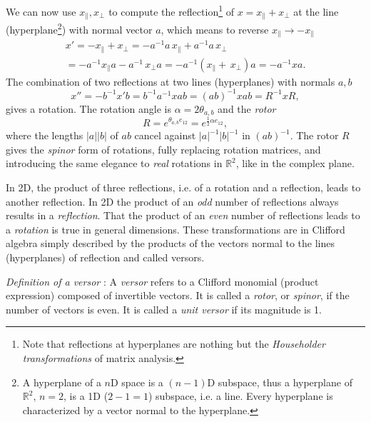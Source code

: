 \documentclass[cameraready]{jcmsi}%
\newcommand{\R}{\mathbb{R}}
\newcommand{\be}{\begin{equation}}
\newcommand{\ee}{\end{equation}}
\begin{document}
We can now use $x_{\parallel}, x_{\perp}$ to compute the reflection\footnote{Note that reflections at hyperplanes are nothing but the \textit{Householder transformations} \cite{Wiki:Householder} of matrix analysis.} of $x=x_{\parallel}+ x_{\perp}$ at the line (hyperplane\footnote{A hyperplane of a $n$D space is a $(n-1)$D subspace, thus a hyperplane of $\R^2$, $n=2$, is a 1D ($2-1=1$) subspace, i.e. a line. Every hyperplane is characterized by a vector normal to the hyperplane.}) with normal vector $a$, which means to reverse $x_{\parallel}\rightarrow -x_{\parallel}$
\begin{gather}
  x' = -x_{\parallel} + x_{\perp} 
  = -a^{-1}a\,x_{\parallel} + a^{-1}a\,x_{\perp} 
  \nonumber \\
  = -a^{-1}x_{\parallel}a - a^{-1}\,x_{\perp}a
  = -a^{-1}(x_{\parallel} +\,x_{\perp})a
  = -a^{-1} x a .
  \label{eq:refl}
\end{gather}
The combination of two reflections at two lines (hyperplanes) with normals $a,b$
\be 
  x'' = -b^{-1} x' b = b^{-1} a^{-1} x ab = (ab)^{-1} x ab = R^{-1} x R ,
\ee 
gives a rotation. The rotation angle is $\alpha = 2 \theta_{a,b}$ and the \textit{rotor}
\be
  R = e^{\theta_{a,b} e_{12}} = e^{\frac{1}{2}\alpha e_{12}},
\ee 
where the lengths $|a||b|$ of $ab$ cancel against 
$|a|^{-1}|b|^{-1}$ in $(ab)^{-1}$.
The rotor $R$ gives the \textit{spinor} form of rotations, fully replacing rotation matrices, and introducing the same elegance to \textit{real} rotations in $\R^2$, like in the complex plane. 

In 2D, the product of three reflections, i.e. of a rotation and a reflection, leads to another reflection. In 2D the product of an \textit{odd} number of reflections always results in a \textit{reflection}. That the product of an \textit{even} number of reflections leads to a \textit{rotation} is true in general dimensions. These transformations are in Clifford algebra simply described by the products of the vectors normal to the lines (hyperplanes) of reflection and called versors. 

\textit{Definition of a versor} \cite{HL:IAandGR}:
A \textit{versor} refers to a Clifford monomial (product expression) composed of invertible vectors. It is called a \textit{rotor}, or \textit{spinor}, if the number of vectors is even. It is called a \textit{unit versor} if its magnitude is 1. 
\end{document}
